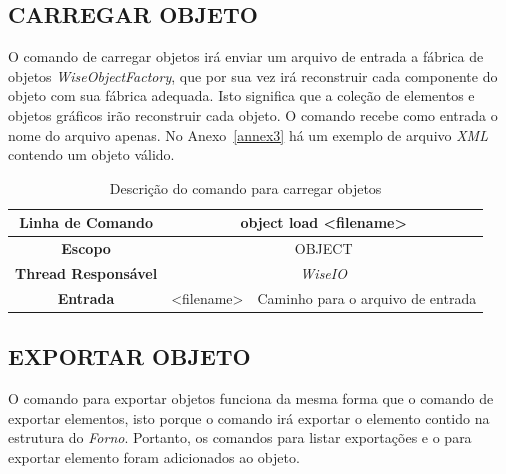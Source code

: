 \subsection{CARREGAR OBJETO}\label{sec:load_object}

O comando de carregar objetos irá enviar um arquivo de entrada a fábrica de objetos \textit{WiseObjectFactory}, que por sua vez irá reconstruir cada componente do objeto com sua fábrica adequada. Isto significa que a coleção de elementos e objetos gráficos irão reconstruir cada objeto. O comando recebe como entrada o nome do arquivo apenas. No Anexo~\ref{annex3} há um exemplo de arquivo \textit{XML} contendo um objeto válido.

\begin{center}
	\begin{table}[!htbp]
		\begin{tabularx}{\textwidth}{c|c|X}
			\toprule
			\textbf{Linha de Comando} & \multicolumn{2}{c}{object load <filename>} \\
			\midrule
			\textbf{Escopo} & \multicolumn{2}{c}{OBJECT} \\
			\hline
			\textbf{Thread Responsável} & \multicolumn{2}{c}{\textit{WiseIO}} \\
			\hline
			\textbf{Entrada} &  <filename> & Caminho para o arquivo de entrada \\
			\bottomrule
		\end{tabularx}
		\caption{Descrição do comando para carregar objetos}
		\label{tab:load_object}
	\end{table}
\end{center}

\subsection{EXPORTAR OBJETO}\label{sec:export_object}

O comando para exportar objetos funciona da mesma forma que o comando de exportar elementos, isto porque o comando irá exportar o elemento contido na estrutura do \textit{Forno}. Portanto, os comandos para listar exportações e o para exportar elemento foram adicionados ao objeto.

